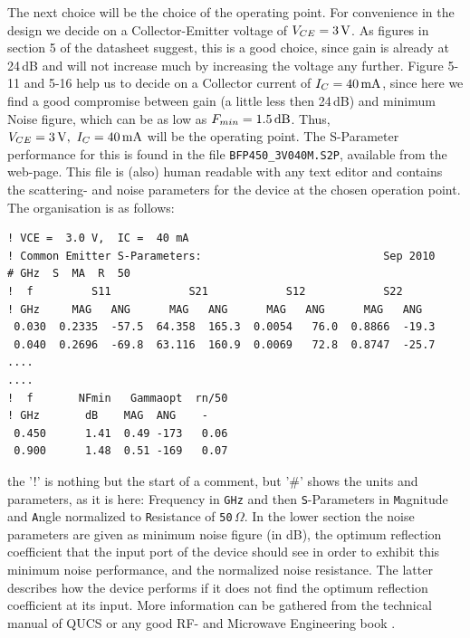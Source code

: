 The next choice will be the choice of the operating point. For
convenience in the design we decide on a Collector-Emitter voltage of
$V_{CE}=3\,\mathrm{V}$. As figures in section 5 of the datasheet
suggest, this is a good choice, since gain is already at 24\,dB and
will  not increase much by increasing the voltage any further. Figure
5-11 and 5-16 help us to decide on a Collector current of
$I_C=40\,\mathrm{mA}$, since here we find a good compromise between gain (a
little less then 24\,dB) and minimum Noise figure, which can be as low
as $F_{min}=1.5\,\mathrm{dB}$. Thus, $V_{CE}=3\,\mathrm{V},\ I_{C}=40\,\mathrm{mA}$
will be the operating point. The S-Parameter performance for this is
found in the file {\tt BFP450\_3V040M.S2P}, available from the
web-page. This file is (also) human readable with any text editor and
contains the scattering- and noise parameters for the device at the
chosen operation point. The organisation is as follows:

\begin{verbatim}
! VCE =  3.0 V,  IC =  40 mA
! Common Emitter S-Parameters:                            Sep 2010
# GHz  S  MA  R  50
!  f         S11            S21            S12            S22
! GHz     MAG   ANG      MAG   ANG      MAG   ANG      MAG   ANG
 0.030  0.2335  -57.5  64.358  165.3  0.0054   76.0  0.8866  -19.3
 0.040  0.2696  -69.8  63.116  160.9  0.0069   72.8  0.8747  -25.7
....
....
!  f       NFmin   Gammaopt  rn/50
! GHz       dB    MAG  ANG    -
 0.450      1.41  0.49 -173   0.06
 0.900      1.48  0.51 -169   0.07
\end{verbatim}

the '!' is nothing but the start of a comment, but '\#' shows the
units and parameters, as it is here: Frequency in {\tt GHz} and then
{\tt S}-Parameters in {\tt M}agnitude and {\tt A}ngle normalized to
{\tt R}esistance of {\tt 50}$\,\Omega$. In the lower section the noise
parameters are given as minimum noise figure (in dB), the optimum
reflection coefficient that the input port of the device should see in
order to exhibit this minimum noise performance, and the normalized
noise resistance. The latter describes how the device performs if
it does not find the optimum reflection coefficient at its input. More
information can be gathered from the technical manual of QUCS or any
good RF- and Microwave Engineering book \cite{qucs,col91,poz05}.


